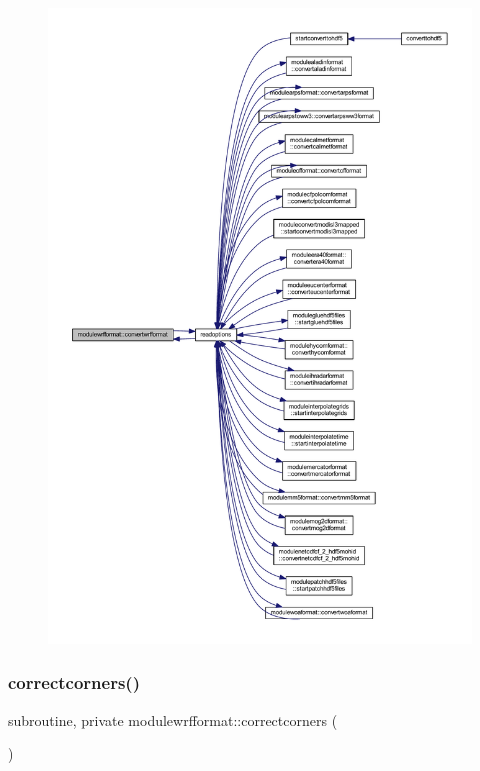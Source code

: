 \begin{figure}[H]
\begin{center}
\leavevmode
\includegraphics[width=350pt]{namespacemodulewrfformat_aa35fbb60f9455409be248675ba032799_icgraph}
\end{center}
\end{figure}
\mbox{\label{namespacemodulewrfformat_a79b585a2293851b1ed94e43076fb4779}} 
\subsubsection{\texorpdfstring{correctcorners()}{correctcorners()}}
{\footnotesize\ttfamily subroutine, private modulewrfformat\+::correctcorners (\begin{DoxyParamCaption}{ }\end{DoxyParamCaption})\hspace{0.3cm}{\ttfamily [private]}}

